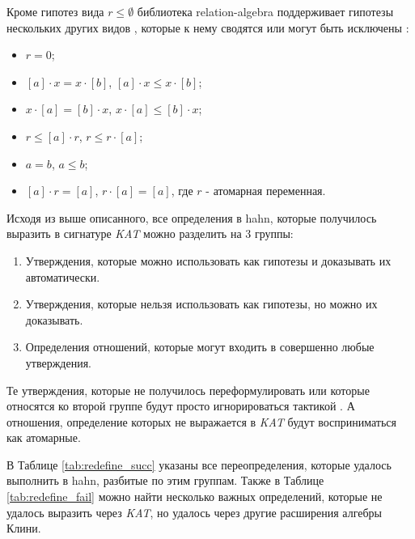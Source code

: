 \documentclass[times
              ,specification
              ,annotation
              ]{itmo-student-thesis}
\begin{document}
      Кроме гипотез вида $r \leq \emptyset$ библиотека relation-algebra поддерживает гипотезы нескольких других
      видов \cite{kat}, которые к нему сводятся или могут быть исключены \cite{hkat,hkat_cpc}:
      \begin{itemize}
        \item $ r = 0 $;
        \item $[a] \cdot x = x \cdot [b]$, $[a] \cdot x \leq x \cdot [b]$;
        \item $x \cdot [a] = [b] \cdot x$, $x \cdot [a] \leq [b] \cdot x$;
        \item $ r \leq [a] \cdot r $, $ r \leq r \cdot [a]$;
        \item $ a = b $, $ a \leq b $;
        \item $[a] \cdot r = [a]$, $r \cdot [a] = [a]$, где $r$ - атомарная переменная.
      \end{itemize}

      Исходя из выше описанного, все определения в hahn, которые получилось выразить в сигнатуре
      \textit{KAT} можно разделить на 3 группы:
      \begin{enumerate}
        \item Утверждения, которые можно использовать как гипотезы и доказывать их автоматически.
        \item Утверждения, которые нельзя использовать как гипотезы, но можно их доказывать.
        \item Определения отношений, которые могут входить в совершенно любые утверждения.
      \end{enumerate}

      Те утверждения, которые не получилось переформулировать или которые относятся ко второй группе будут
      просто игнорироваться тактикой . А отношения, определение которых не выражается в
      \textit{KAT} будут восприниматься как атомарные. 
      
      В Таблице \ref{tab:redefine_succ} указаны все переопределения,
      которые удалось выполнить в hahn, разбитые по этим группам.
      Также в Таблице \ref{tab:redefine_fail} можно найти несколько
      важных определений, которые не удалось выразить через \textit{KAT},
      но удалось через другие расширения алгебры Клини.
\end{document}
